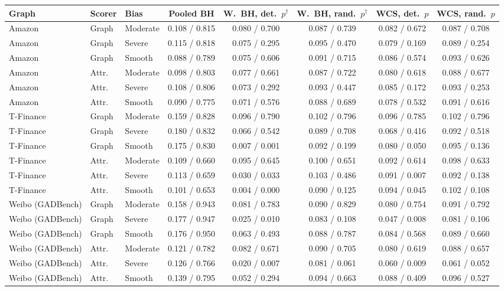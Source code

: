 \begin{tabular}{lllccccc}
\toprule
Graph & Scorer & Bias & Pooled BH & W.\ BH, det.\ $p^\dagger$ & W.\ BH, rand.\ $p^\dagger$ & WCS, det.\ $p$ & WCS, rand.\ $p$\\
\midrule
Amazon & Graph & Moderate & 0.108 / 0.815 & 0.080 / 0.700 & 0.087 / 0.739 & 0.082 / 0.672 & 0.087 / 0.708\\
Amazon & Graph & Severe & 0.115 / 0.818 & 0.075 / 0.295 & 0.095 / 0.470 & 0.079 / 0.169 & 0.089 / 0.254\\
Amazon & Graph & Smooth & 0.088 / 0.789 & 0.075 / 0.606 & 0.091 / 0.715 & 0.086 / 0.574 & 0.093 / 0.626\\
Amazon & Attr. & Moderate & 0.098 / 0.803 & 0.077 / 0.661 & 0.087 / 0.722 & 0.080 / 0.618 & 0.088 / 0.677\\
Amazon & Attr. & Severe & 0.108 / 0.806 & 0.073 / 0.292 & 0.093 / 0.447 & 0.085 / 0.172 & 0.093 / 0.253\\
Amazon & Attr. & Smooth & 0.090 / 0.775 & 0.071 / 0.576 & 0.088 / 0.689 & 0.078 / 0.532 & 0.091 / 0.616\\
\midrule
T-Finance & Graph & Moderate & 0.159 / 0.828 & 0.096 / 0.790 & 0.102 / 0.796 & 0.096 / 0.785 & 0.102 / 0.796\\
T-Finance & Graph & Severe & 0.180 / 0.832 & 0.066 / 0.542 & 0.089 / 0.708 & 0.068 / 0.416 & 0.092 / 0.518\\
T-Finance & Graph & Smooth & 0.175 / 0.830 & 0.007 / 0.001 & 0.092 / 0.199 & 0.080 / 0.050 & 0.095 / 0.136\\
T-Finance & Attr. & Moderate & 0.109 / 0.660 & 0.095 / 0.645 & 0.100 / 0.651 & 0.092 / 0.614 & 0.098 / 0.633\\
T-Finance & Attr. & Severe & 0.113 / 0.659 & 0.030 / 0.033 & 0.103 / 0.486 & 0.091 / 0.007 & 0.092 / 0.138\\
T-Finance & Attr. & Smooth & 0.101 / 0.653 & 0.004 / 0.000 & 0.090 / 0.125 & 0.094 / 0.045 & 0.102 / 0.108\\
\midrule
Weibo (GADBench) & Graph & Moderate & 0.158 / 0.943 & 0.081 / 0.783 & 0.090 / 0.829 & 0.080 / 0.754 & 0.091 / 0.792\\
Weibo (GADBench) & Graph & Severe & 0.177 / 0.947 & 0.025 / 0.010 & 0.083 / 0.108 & 0.047 / 0.008 & 0.081 / 0.106\\
Weibo (GADBench) & Graph & Smooth & 0.176 / 0.950 & 0.063 / 0.493 & 0.088 / 0.787 & 0.084 / 0.568 & 0.089 / 0.660\\
Weibo (GADBench) & Attr. & Moderate & 0.121 / 0.782 & 0.082 / 0.671 & 0.090 / 0.705 & 0.080 / 0.619 & 0.088 / 0.657\\
Weibo (GADBench) & Attr. & Severe & 0.126 / 0.766 & 0.020 / 0.007 & 0.081 / 0.061 & 0.060 / 0.009 & 0.061 / 0.052\\
Weibo (GADBench) & Attr. & Smooth & 0.139 / 0.795 & 0.052 / 0.294 & 0.094 / 0.663 & 0.088 / 0.409 & 0.096 / 0.527\\
\bottomrule
\end{tabular}
